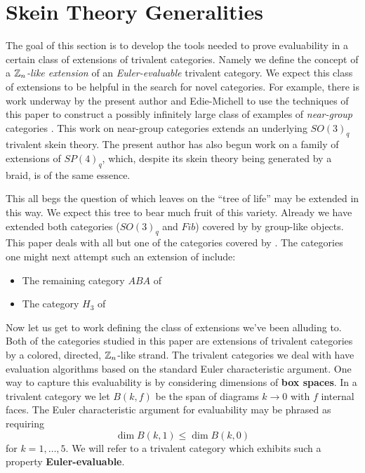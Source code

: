 \section{Skein Theory Generalities}

The goal of this section is to develop the tools needed to prove evaluability in a certain class of extensions of trivalent categories.
Namely we define the concept of a {\it $\mathbb{Z}_n$-like extension} of an {\it Euler-evaluable} trivalent category.
We expect this class of extensions to be helpful in the search for novel categories.
For example, there is work underway by the present author and Edie-Michell to use the techniques of this paper to 
construct a possibly infinitely large class of examples of {\it near-group} categories \cite{gannon_near-groups}.
This work on near-group categories \cite{cain_me_near_groups} extends an underlying $SO(3)_q$ trivalent skein theory.
The present author has also begun work \cite{me_sp4} on a family of extensions of $SP(4)_q$, which, despite its skein theory being
generated by a braid, is of the same essence. 


This all begs the question of which leaves on the ``tree of life'' \cite{tricats} may be extended in this way.
We expect this tree to bear much fruit of this variety.
Already we have extended both categories ($SO(3)_q$ and $Fib$) covered by \cite[Theorem A]{tricats} by group-like objects.
This paper deals with all but one of the categories covered by \cite[Theorem B]{tricats}.
The categories one might next attempt such an extension of include:
\begin{itemize}
    \item The remaining category $ABA$ of \cite[Theorem B]{tricats}
    \item The category $H_3$ of \cite[Theorem C]{tricats}
\end{itemize}

Now let us get to work defining the class of extensions we've been alluding to.
Both of the categories studied in this paper are extensions of trivalent categories by a colored, directed, $\mathbb{Z}_n$-like strand. 
The trivalent categories we deal with have evaluation algorithms based on the standard Euler characteristic argument.
One way to capture this evaluability is by considering dimensions of {\bf box spaces}.
In a trivalent category we let $B(k,f)$ be the span of diagrams $k\to0$ with $f$ internal faces.
The Euler characteristic argument for evaluability may be phrased as requiring
\[
    \dim B(k,1) \leq \dim B(k,0)
\]
for $k=1,\dots,5$.
We will refer to a trivalent category which exhibits such a property {\bf Euler-evaluable}.

